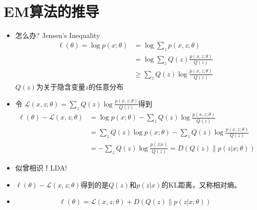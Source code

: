 \documentclass[noindent]{beamer}
\begin{document}
\section{EM算法的推导}
\begin{frame}
\begin{itemize}
\item {
怎么办? \pause Jensen's Inequality
\begin{equation}
\begin{split}
\ell(\theta)=\log p(x;\theta) &=  \log  \sum_{z}p(x,z;\theta) \\
			   &= \log \sum_{z}Q(z)\frac{p(x,z;\theta)}{Q(z)} \\
                           &\geq \sum_{z}Q(z)\log \frac{p(x,z;\theta)}{Q(z)} 
\end{split}
\end{equation}
$Q(z)$为关于隐含变量$z$的任意分布
}
\end{itemize}
\end{frame}
\begin{frame}
\begin{itemize}
\item { 
令 $\displaystyle \mathcal{L}(x,z;\theta) = \sum_{z}Q(z) \log \frac{p(x,z;\theta)}{Q(z)} $得到
\begin{equation}
\begin{split}
\ell(\theta)-\mathcal{L}(x,z;\theta) &= \log p(x;\theta)-\sum_{z}Q(z)\log \frac{p(x,z;\theta)}{Q(z)} \\
                        &= \sum_{z} Q(z) \log p(x;\theta)-\sum_{z}Q(z)\log \frac{p(x,z;\theta)}{Q(z)} \\
			&= -\sum_{z}Q(z)\log\frac{p(z|x)}{Q(z)} = D(Q(z) \parallel p(z|x; \theta ))
\end{split}
\end{equation}
}
\item {
似曾相识！\pause LDA!
}
\item {
$\ell(\theta)-\mathcal{L}(x,z;\theta)$得到的是$Q(z)$和$p(z|x)$的KL距离，又称相对熵。
}
\item {
\begin{equation}
\ell(\theta) = \mathcal{L}(x,z;\theta) + D(Q(z) \parallel p(z|x; \theta ))
\end{equation}
}
\end{itemize}
\end{frame}
\end{document}
